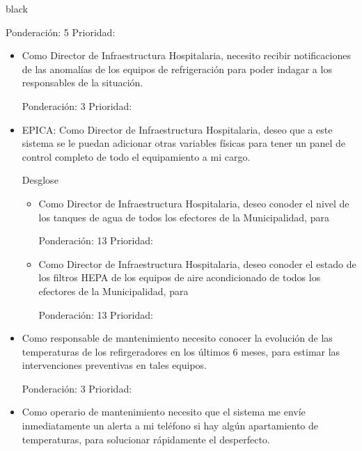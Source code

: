 \documentclass[11pt]{charter}
\begin{document}
\begin{consigna}{black}
\begin{itemize}
\begin{itemize}
Ponderación: 5 Prioridad:
	\end{itemize}

	\begin{itemize}
	\item Como Director de Infraestructura Hospitalaria, necesito recibir notificaciones de las anomalías de los equipos de refrigeración para poder indagar a los responsables de la situación.  

Ponderación: 3 Prioridad:
	\end{itemize}

\end{itemize}


\begin{itemize}
\item EPICA: Como Director de Infraestructura Hospitalaria, deseo que a este sistema se le puedan adicionar otras variables físicas para tener un panel de control completo de todo el equipamiento a mi cargo. 

Desglose

	\begin{itemize}
	\item Como Director de Infraestructura Hospitalaria, deseo conoder el nivel de los tanques de agua de todos los efectores de la Municipalidad, para  
	
Ponderación: 13 Prioridad:
	\end{itemize}

	\begin{itemize}
	\item Como Director de Infraestructura Hospitalaria, deseo conoder el estado de los filtros HEPA de los equipos de aire acondicionado de todos los efectores de la Municipalidad, para 
	
Ponderación: 13 Prioridad:
	\end{itemize}

\end{itemize}

\begin{itemize}
\item Como responsable de mantenimiento necesito conocer la evolución de las temperaturas de los refirgeradores en los últimos 6 meses, para estimar las intervenciones preventivas en tales equipos. 

Ponderación: 3 Prioridad:
\end{itemize}


\begin{itemize}
\item Como operario de mantenimiento necesito que el sistema me envíe inmediatamente un alerta a mi teléfono si hay algún apartamiento de temperaturas, para solucionar rápidamente el desperfecto. 


\end{itemize}
\end{consigna}
\end{document}

